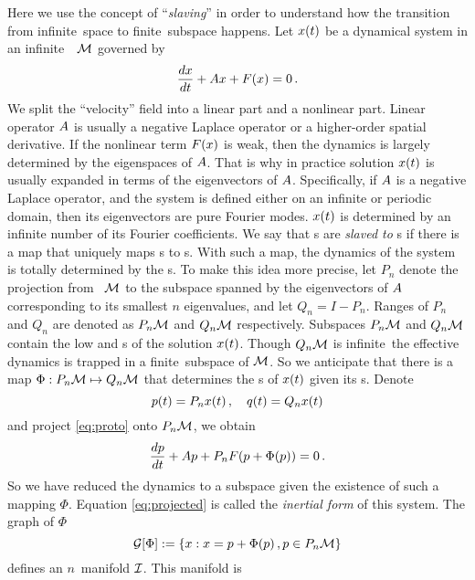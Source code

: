 Here we use the concept of
``\emph{slaving}'' in order to understand how the transition from infinite\dmn\
space to finite\dmn\ subspace happens. Let $x(t)$ be a dynamical
system in an infinite\dmn\ \statesp\ $\mathcal{M}$ governed by
\begin{equation}
  \label{eq:proto}
  \frac{dx}{dt} + A x + F{(}x) = 0
  \,.
\end{equation}
We split the ``velocity'' field into a linear part and a nonlinear part.
Linear
operator $A$ is usually a negative Laplace operator or a higher-order spatial
derivative. If the nonlinear term $F{(}x)$ is weak, then the dynamics is
largely determined by the eigenspaces of $A$. That is why in practice
solution $x(t)$ is usually expanded in terms of the eigenvectors of $A$.
Specifically, if $A$ is a negative Laplace operator, and the system is
defined either on an infinite or periodic domain,
then its eigenvectors are pure Fourier modes.
$x(t)$ is determined by an infinite number of its
Fourier coefficients. We say that \highmode s are \emph{slaved to}
\lowmode s if
there is a map that uniquely maps \lowmode s to \highmode s. With such a map,
the dynamics of the system is totally determined by the \lowmode s. To make this
idea more precise,
let $P_n$ denote the projection from \statesp\ $\mathcal{M}$ to the subspace spanned
by the eigenvectors of $A$ corresponding to its smallest $n$ eigenvalues,
and let $Q_n = I - P_n$. Ranges of $P_n$ and $Q_n$ are denoted
as $P_n\mathcal{M}$ and $Q_n\mathcal{M}$ respectively.
Subspaces $P_n\mathcal{M}$ and $Q_n\mathcal{M}$ contain the low and \highmode s of
the solution $x(t)$.
Though $Q_n\mathcal{M}$ is infinite\dmn\, the effective dynamics is trapped in a
finite\dmn\ subspace of $\mathcal{M}$. So we anticipate that there is
a map $\Phi:P_n\mathcal{M}\mapsto Q_n\mathcal{M}$ that determines the \highmode s
of $x(t)$ given its \lowmode s.
Denote
\begin{equation}
  \label{eq:pq}
  p(t) = P_nx(t) \,,\quad q(t) = Q_nx(t)
\end{equation}
and project \eqref{eq:proto} onto $P_n\mathcal{M}$, we obtain
\begin{equation}
  \label{eq:projected}
  \frac{dp}{dt} + A p + P_n F{(}p+\Phi(p)) = 0
  \,.
\end{equation}
So we have reduced the dynamics to a
subspace given the existence of such a mapping $\Phi$.
Equation \eqref{eq:projected} is
called the \emph{inertial form} of this system.
The graph of $\Phi$
\[
  \mathcal{G}[\Phi] := \{x: x = p + \Phi(p)\,, p\in P_n\mathcal{M}\}
\]
defines an $n$\dmn\ manifold $\mathcal{I}$. This manifold is

